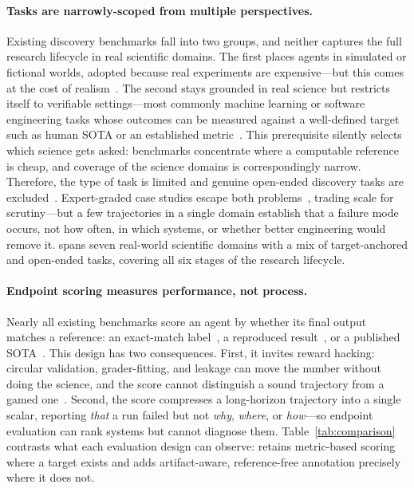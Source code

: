 \paragraph{Tasks are narrowly-scoped from multiple perspectives.}
Existing discovery benchmarks fall into two groups, and neither captures the
full research lifecycle in real scientific domains. The first places agents in
simulated or fictional worlds, adopted because real experiments are
expensive---but this comes at the cost of
realism~\citep{jansen2024discoveryworldvirtualenvironmentdeveloping,
wang2022scienceworldagentsmarter5th, majumder2024discoverybenchdatadrivendiscoverylarge,
li2026pdagentbenchcharacterizinggroundingarchitecting}. The second stays
grounded in real science but restricts itself to verifiable settings---most
commonly machine learning or software engineering tasks whose outcomes can be
measured against a well-defined target such as human SOTA or an established
metric~\citep{chan2025mle, nathani2025mlgym, starace2025paperbench,
chen2025scienceagentbenchrigorousassessmentlanguage, tian2024scicode,
wang2026naturebench, xu2026researchclawbench}. This prerequisite silently
selects which science gets asked: benchmarks concentrate where a computable
reference is cheap, and coverage of the science domains is correspondingly
narrow. Therefore, the type of task is limited and genuine open-ended discovery tasks are excluded~\citep{wang2026selfrevisingdiscoverysystemsscience}.
Expert-graded case studies escape both
problems~\citep{kirgis2026shadow, li2026scicomp, rawat2026plausible,
horstmann2026neuro, eulig2026cawm}, trading scale for scrutiny---but a few
trajectories in a single domain establish that a failure mode occurs, not how
often, in which systems, or whether better engineering would remove it.
\bench spans seven real-world scientific domains with a mix of
target-anchored and open-ended tasks, covering all six stages of the research
lifecycle.

\paragraph{Endpoint scoring measures performance, not process.}
Nearly all existing benchmarks score an agent by whether its final output
matches a reference: an exact-match label~\citep{rein2023gpqa,
phan2025humanity}, a reproduced result~\citep{siegel2024core, hu2025repro,
starace2025paperbench}, or a published SOTA~\citep{chan2025mle,
wang2026naturebench}. This design has two consequences. First, it invites
reward hacking: circular validation, grader-fitting, and leakage can move the
number without doing the science, and the score cannot distinguish a sound
trajectory from a gamed one~\citep{chan2025mle, hu2025repro,
wang2026naturebench}. Second, the score compresses a long-horizon trajectory
into a single scalar, reporting \emph{that} a run failed but not \emph{why},
\emph{where}, or \emph{how}---so endpoint evaluation can rank systems but
cannot diagnose them. Table~\ref{tab:comparison} contrasts what each evaluation
design can observe: \bench retains metric-based scoring where a target
exists and adds artifact-aware, reference-free annotation precisely where it
does not.


